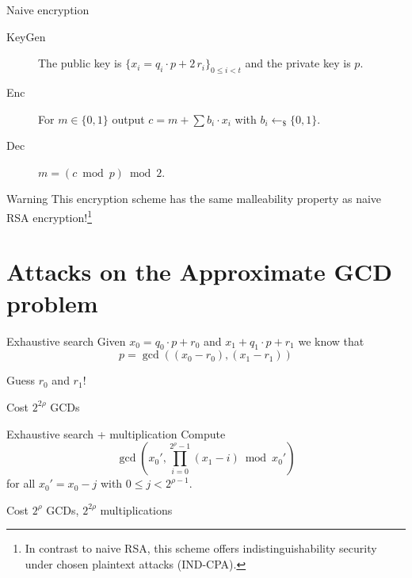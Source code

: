 \documentclass[presentation,smaller]{beamer}
\newcommand{\sample}{\ensuremath{\leftarrow_{\$}}}
\begin{document}
\begin{frame}[label={sec:org5350706}]{Naive encryption}
\begin{description}
\item[{KeyGen}] The public key is \(\{x_i = q_i ⋅ p + 2\,r_i\}_{0 ≤ i < t}\) and the private key is \(p\).

\item[{Enc}] For \(m \in \{0,1\}\) output \(c = m + \sum b_i ⋅ x_i\) with \(b_i \sample \{0,1\}\).

\item[{Dec}] \(m = (c \bmod p) \bmod 2\).
\end{description}

\pause

\begin{block}{Warning}
This encryption scheme has the same malleability property as naive RSA encryption!\footnote{In contrast to naive RSA, this scheme offers indistinguishability security under chosen plaintext attacks (IND-CPA).}
\end{block}
\end{frame}

\section{Attacks on the Approximate GCD problem}
\label{sec:org6fb52bc}

\begin{frame}[label={sec:orgd333adb}]{Exhaustive search}
Given \(x_0 = q_0 ⋅ p + r_0\) and \(x_1 + q_1 ⋅ p + r_1\) we know that \[p = \gcd\left((x_0 - r_0), (x_1 - r_1)\right)\]


Guess \(r_0\) and \(r_1\)!

\begin{block}{Cost}
\(2^{2ρ}\) GCDs
\end{block}
\end{frame}

\begin{frame}[label={sec:org100f612}]{Exhaustive search + multiplication}
Compute \[\gcd\left(x_0', \prod_{i=0}^{2^ρ-1} (x_1 - i) \bmod x_0'\right)\] for all \(x_0' = x_0 - j\) with \(0 \leq j < 2^{ρ-1}\).

\begin{block}{Cost}
\(2^ρ\) GCDs, \(2^{2ρ}\) multiplications
\end{block}
\end{frame}
\end{document}
